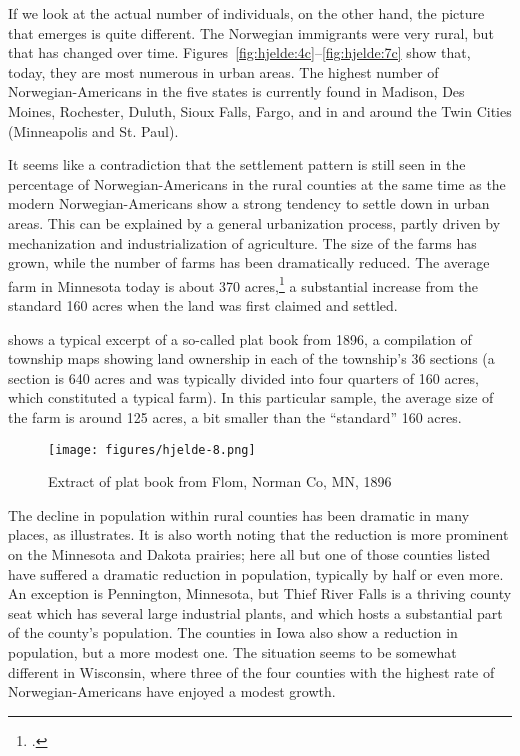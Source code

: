 \documentclass[output=paper]{langscibook}
\begin{document}
If we look at the actual number of individuals, on the other hand, the picture that emerges is quite different. The Norwegian immigrants were very rural, but that has changed over time. Figures~\ref{fig:hjelde:4c}--\ref{fig:hjelde:7c} show that, today, they are most numerous in urban areas. The highest number of Norwegian\hyp Americans in the five states is currently found in Madison, Des Moines, Rochester, Duluth, Sioux Falls, Fargo, and in and around the Twin Cities (Minneapolis and St. Paul).

It seems like a contradiction that the settlement pattern is still seen in the percentage of Norwegian\hyp Americans in the rural counties at the same time as the modern Norwegian\hyp Americans show a strong tendency to settle down in urban areas. This can be explained by a general urbanization process, partly driven by mechanization and industrialization of agriculture. The size of the farms has grown, while the number of farms has been dramatically reduced. The average farm in Minnesota today is about 370 acres,\footnote{\citet{USDA2022}.} a substantial increase from the standard 160 acres when the land was first claimed and settled. 

 shows a typical excerpt of a so-called plat book from 1896, a compilation of township maps showing land ownership in each of the township’s 36 sections (a section is 640 acres and was typically divided into four quarters of 160 acres, which constituted a typical farm). In this particular sample, the average size of the farm is around 125 acres, a bit smaller than the “standard” 160 acres.

  
\begin{figure}
\texttt{[image: figures/hjelde-8.png]}
\caption{Extract of plat book from Flom, Norman Co, MN, 1896}
\label{fig:hjelde:8}
\end{figure}

The decline in population within rural counties has been dramatic in many places, as  illustrates. It is also worth noting that the reduction is more prominent on the Minnesota and Dakota prairies; here all but one of those counties listed have suffered a dramatic reduction in population, typically by half or even more. An exception is Pennington, Minnesota, but Thief River Falls is a thriving county seat which has several large industrial plants, and which hosts a substantial part of the county’s population. The counties in Iowa also show a reduction in population, but a more modest one. The situation seems to be somewhat different in Wisconsin, where three of the four counties with the highest rate of Norwegian\hyp Americans have enjoyed a modest growth.
\end{document}
